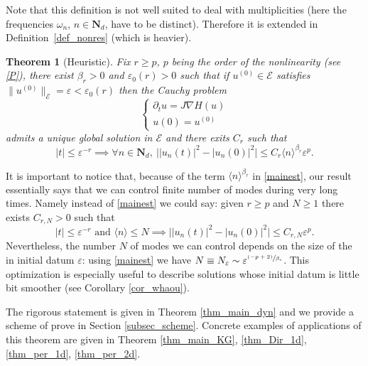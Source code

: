 \documentclass[JEP,XML,SOM,Unicode,NoEqCountersInSection,published]{cedram}
\newcommand{\psfrac}[2]{\sfrac{(#1)}{#2}}
\newtheorem{theorem}{Theorem}[section]
\theoremstyle{definition}
\begin{document}
Note that this definition is not well suited to deal with multiplicities (here the frequencies $\omega_n$, $n\in \mathbf{N}_d$, have to be distinct). Therefore it is extended in Definition~\ref{def_nonres} (which is heavier).

\begin{theorem}[Heuristic]\label{sketch}
Fix $r\geq p$, $p$ being the order of the nonlinearity (see \eqref{P}), there exist $\beta_r>0$ and $\varepsilon_0(r)>0$ such that if $u^{(0)} \in{\mathcal{E}}$ satisfies $\| u^{(0)} \|_{{\mathcal{E}}}=\varepsilon<\varepsilon_0(r)$ then the Cauchy problem
\[
\begin{cases}\partial_t u=J\nabla H(u)\\u(0)=u^{(0)} \end{cases}
\]
admits a unique global solution in $\mathcal E$ and there exits $C_r$ such that
\begin{equation}\label{mainest}
|t|\leq \varepsilon^{-r} \implies \forall n\in \mathbf{N}_d,\ \bigl ||u_n(t)|^2-|u_n(0)|^2\bigr|\leq C_r\langle n\rangle^{\beta_r}\varepsilon^p.
\end{equation}
\end{theorem}
It is important to notice that, because of the term $\langle n\rangle^{\beta_r}$ in \eqref{mainest}, our result essentially says that we can control finite number of modes during very long times. Namely instead of \eqref{mainest} we could say: given $r\geq p$ and $N\geq 1$ there exists $C_{r,N}>0$ such that
\[
|t|\leq \varepsilon^{-r} \text{ and } \langle n\rangle\leq N \implies \bigl ||u_n(t)|^2-|u_n(0)|^2\bigr|\leq C_{r,N}\varepsilon^p.
\]
Nevertheless, the number $N$ of modes we can control depends on the size of the in initial datum $\varepsilon$: using \eqref{mainest} we have $N\equiv N_\varepsilon\sim \varepsilon^{\psfrac{-p+2}{\beta_r}}$. This optimization is especially useful to describe solutions whose initial datum is little bit smoother (see \eg Corollary \ref{cor_whaou}).

The rigorous statement is given in Theorem \ref{thm_main_dyn} and we provide a scheme of prove in Section \ref{subsec_scheme}. Concrete examples of applications of this theorem are given in Theorem \ref{thm_main_KG}, \ref{thm_Dir_1d}, \ref{thm_per_1d}, \ref{thm_per_2d}.

\end{document}
